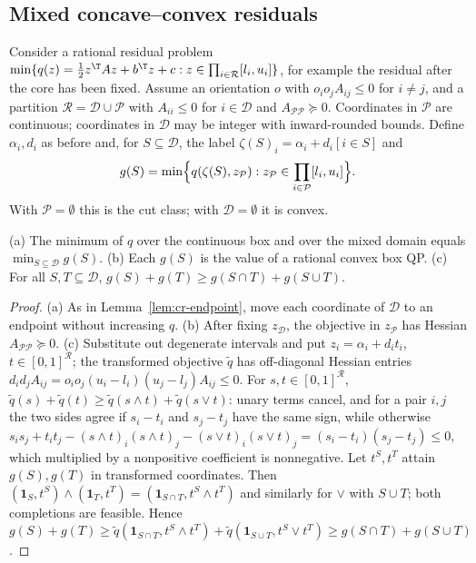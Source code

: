 \subsection{Mixed concave--convex residuals}\label{sec:cr-mixed}

Consider a rational residual problem
$\min\{q(z)=\frac12z^{\T}Az+b^{\T}z+c : z\in\prod_{i\in\mathcal R}[l_i,u_i]\}$,
for example the residual after the core has been fixed. Assume an
orientation $o$ with $o_io_jA_{ij}\le0$ for $i\ne j$, and a partition
$\mathcal R=\mathcal D\cup\mathcal P$ with $A_{ii}\le0$ for $i\in\mathcal D$ and
$A_{\mathcal P\mathcal P}\succeq0$. Coordinates in $\mathcal P$ are
continuous; coordinates in $\mathcal D$ may be integer with inward-rounded
bounds. Define $\alpha_i,d_i$ as before and, for
$S\subseteq\mathcal D$, the label $\zeta(S)_i=\alpha_i+d_i[i\in S]$ and
\[
g(S)=\min\Bigl\{q(\zeta(S),z_{\mathcal P}) :
z_{\mathcal P}\in\prod_{i\in\mathcal P}[l_i,u_i]\Bigr\}.
\]
With $\mathcal P=\emptyset$ this is the cut class; with
$\mathcal D=\emptyset$ it is convex.

\begin{proposition}\label{prop:cr-submod}
(a) The minimum of $q$ over the continuous box and over the mixed domain
equals $\min_{S\subseteq\mathcal D}g(S)$.
(b) Each $g(S)$ is the value of a rational convex box QP.
(c) For all $S,T\subseteq\mathcal D$,
$g(S)+g(T)\ge g(S\cap T)+g(S\cup T)$.
\end{proposition}
\begin{proof}
(a) As in Lemma~\ref{lem:cr-endpoint}, move each coordinate of
$\mathcal D$ to an endpoint without increasing $q$. (b) After fixing
$z_{\mathcal D}$, the objective in $z_{\mathcal P}$ has Hessian
$A_{\mathcal P\mathcal P}\succeq0$. (c) Substitute out degenerate intervals
and put $z_i=\alpha_i+d_it_i$, $t\in[0,1]^{\mathcal R}$; the transformed objective
$\tilde q$ has off-diagonal Hessian entries
$d_id_jA_{ij}=o_io_j(u_i-l_i)(u_j-l_j)A_{ij}\le0$. For $s,t\in[0,1]^{\mathcal R}$,
$\tilde q(s)+\tilde q(t)\ge\tilde q(s\wedge t)+\tilde q(s\vee t)$: unary terms
cancel, and for a pair $i,j$ the two sides agree if $s_i-t_i$ and
$s_j-t_j$ have the same sign, while otherwise
$s_is_j+t_it_j-(s\wedge t)_i(s\wedge t)_j-(s\vee t)_i(s\vee t)_j
=(s_i-t_i)(s_j-t_j)\le0$, which multiplied by a nonpositive coefficient is
nonnegative. Let $t^S,t^T$ attain $g(S),g(T)$ in transformed
coordinates. Then $(\mathbf 1_S,t^S)\wedge(\mathbf 1_T,t^T)
=(\mathbf 1_{S\cap T},t^S\wedge t^T)$ and similarly for $\vee$ with
$S\cup T$; both completions are feasible. Hence
$g(S)+g(T)\ge\tilde q(\mathbf 1_{S\cap T},t^S\wedge t^T)
+\tilde q(\mathbf 1_{S\cup T},t^S\vee t^T)\ge g(S\cap T)+g(S\cup T)$.
\end{proof}

